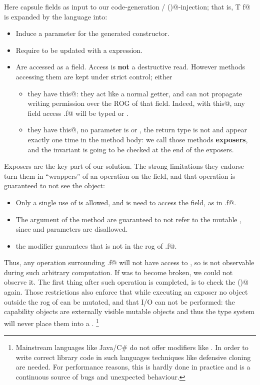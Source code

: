 Here capsule fields 
as input to our code-generation / \Q@validate()@-injection; that is, \Q@capsule T f@ is expanded by the language into:
\begin{itemize}
\item Induce a \Q@capsule@ parameter for the generated constructor.
\item Require to be updated with a \Q@capsule@ expression.
\item Are accessed as a \Q@mut@ field.
Access is \textbf{not} a destructive read.
 However methods accessing them are kept under
strict control; either
\begin{itemize}
\item they have \Q@read this@: they act like a normal getter, and can not propagate
writing permission over the ROG of that field.
Indeed, with \Q@read this@, any field access \Q@this.f@ will be typed \Q@read@ or \Q@imm@.
\item they have \Q@mut this@, no parameter is \Q@mut@ or \Q@read@,
the return type is not \Q@mut@ and \Q@this@ appear exactly one time in
the method body: we call those methods \textbf{exposers}, and the invariant is going to be checked at the end of
the exposers.
\end{itemize}


\end{itemize}
Exposers are the key part of our solution.
The strong limitations they endorse turn them in ``wrappers'' of an operation 
on the field, and that operation is guaranteed to not see the \Q@this@ object:
\begin{itemize}
\item Only a single use of \Q@this@ is allowed, and is need to access the field, as in \Q@this.f@.
\item The argument of the method are guaranteed to not refer to the mutable \Q@this@, since \Q@mut@ and \Q@read@
parameters are disallowed.
\item the \Q@capsule@ modifier guarantees that 
\Q@this@ is not in the rog of \Q@this.f@.
\end{itemize}
Thus, any operation surrounding \Q@this.f@ will not have access to \Q@this@, so \Q@this@ is not observable
during such arbitrary computation.
If \Q@this@ was to become broken, we could not  observe it.
The first thing after such operation is completed, is to check the \Q@invariant()@ again.
Those restrictions also enforce that while executing an exposer no object outside the rog of \Q@this@ can be mutated,
and that I/O can not be performed: the capability objects are externally visible mutable objects and thus the type system will
never place them into a \Q@capsule@.%
\footnote{
Mainstream languages like Java/C\# do not offer modifiers like \Q@capsule@.
In order to write correct library code in such languages techniques like
defensive cloning~\cite{Bloch08} are needed.
For performance reasons, this is hardly done in practice and is a continuous source of bugs and unexpected behaviour.
}

